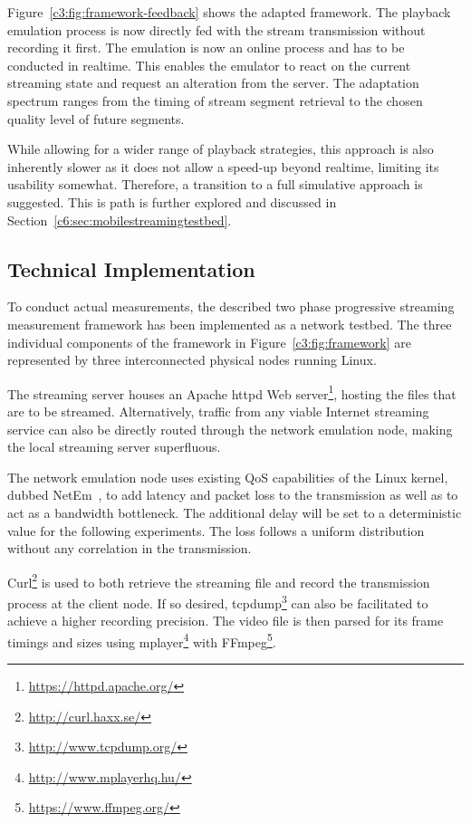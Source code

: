 Figure~\ref{c3:fig:framework-feedback} shows the adapted framework. The playback emulation process is now directly fed with the stream transmission without recording it first. The emulation is now an online process and has to be conducted in realtime. This enables the emulator to react on the current streaming state and request an alteration from the server. The adaptation spectrum ranges from the timing of stream segment retrieval to the chosen quality level of future segments. 

While allowing for a wider range of playback strategies, this approach is also inherently slower as it does not allow a speed-up beyond realtime, limiting its usability somewhat. Therefore, a transition to a full simulative approach is suggested. This is path is further explored and discussed in Section~\ref{c6:sec:mobilestreamingtestbed}.


\subsection{Technical Implementation}

To conduct actual measurements, the described two phase progressive streaming measurement framework has been implemented as a network testbed. The three individual components of the framework in Figure~\ref{c3:fig:framework} are represented by three interconnected physical nodes running Linux. 

The streaming server houses an Apache httpd Web server\footnote{\url{https://httpd.apache.org/}}, hosting the files that are to be streamed. Alternatively, traffic from any viable Internet streaming service can also be directly routed through the network emulation node, making the local streaming server superfluous.

The network emulation node uses existing \gls{QoS} capabilities of the Linux kernel, dubbed NetEm~\cite{hemminger2005network}, to add latency and packet loss to the transmission as well as to act as a bandwidth bottleneck. The additional delay will be set to a deterministic value for the following experiments. The loss follows a uniform distribution without any correlation in the transmission.

Curl\footnote{\url{http://curl.haxx.se/}} is used to both retrieve the streaming file and record the transmission process at the client node. If so desired, tcpdump\footnote{\url{http://www.tcpdump.org/}} can also be facilitated to achieve a higher recording precision. The video file is then parsed for its frame timings and sizes using mplayer\footnote{\url{http://www.mplayerhq.hu/}} with FFmpeg\footnote{\url{https://www.ffmpeg.org/}}. 

